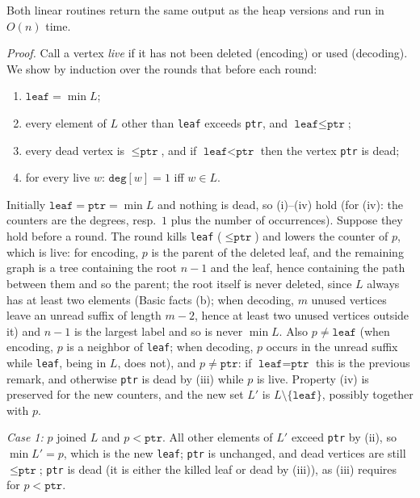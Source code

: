 \documentclass[11pt]{article}
\begin{document}
\begin{theorembox}
Both linear routines return the same output as the heap versions and run
in $O(n)$ time.

\emph{Proof.} Call a vertex \emph{live} if it has not been deleted
(encoding) or used (decoding). We show by induction over the rounds that
before each round:
\begin{enumerate}[leftmargin=1.8em,itemsep=1pt,label=(\roman*)]
  \item $\texttt{leaf}=\min L$;
  \item every element of $L$ other than \texttt{leaf} exceeds \texttt{ptr},
        and $\texttt{leaf}\le\texttt{ptr}$;
  \item every dead vertex is $\le\texttt{ptr}$, and if
        $\texttt{leaf}<\texttt{ptr}$ then the vertex \texttt{ptr} is dead;
  \item for every live $w$: $\texttt{deg}[w]=1$ iff $w\in L$.
\end{enumerate}
Initially $\texttt{leaf}=\texttt{ptr}=\min L$ and nothing is dead, so
(i)--(iv) hold (for (iv): the counters are the degrees, resp.\ $1$ plus the
number of occurrences). Suppose they hold before a round. The round
kills \texttt{leaf} ($\le\texttt{ptr}$) and lowers the counter of $p$,
which is live: for encoding, $p$ is the parent of the deleted leaf, and the
remaining graph is a tree containing the root $n-1$ and the leaf, hence
containing the path between them and so the parent; the root itself is
never deleted, since $L$ always has at least two elements
(Basic facts (b); when decoding, $m$ unused vertices leave an unread suffix
of length $m-2$, hence at least two unused vertices outside it) and
$n-1$ is the largest label and so is never $\min L$. Also
$p\ne\texttt{leaf}$ (when encoding, $p$ is a neighbor of \texttt{leaf};
when decoding, $p$ occurs in the unread suffix while \texttt{leaf}, being
in $L$, does not), and $p\ne\texttt{ptr}$: if $\texttt{leaf}=\texttt{ptr}$
this is the previous remark, and otherwise \texttt{ptr} is dead by (iii)
while $p$ is live. Property (iv) is preserved
for the new counters, and the new set $L'$ is $L\setminus\{\texttt{leaf}\}$,
possibly together with $p$.

\emph{Case 1:} $p$ joined $L$ and $p<\texttt{ptr}$. All other elements of
$L'$ exceed \texttt{ptr} by (ii), so $\min L'=p$, which is the new
\texttt{leaf}; \texttt{ptr} is unchanged, and dead vertices are still
$\le\texttt{ptr}$; \texttt{ptr} is dead (it is either the killed leaf or
dead by (iii)), as (iii) requires for $p<\texttt{ptr}$.


\end{theorembox}
\end{document}
